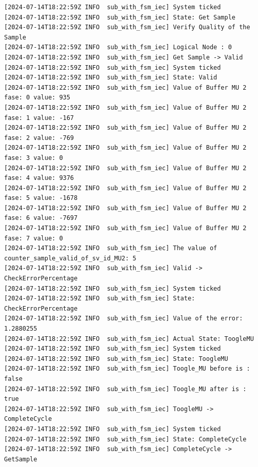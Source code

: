 \begin{lstlisting}[caption={Second scenario showing the steps through the state machine between the state Get Sample -> Valid, Valid -> Check the Error Percentage -> Toogle MU -> Complete Cycle -> Get Sample.}, label={lst:scenario2}]
[2024-07-14T18:22:59Z INFO  sub_with_fsm_iec] System ticked
[2024-07-14T18:22:59Z INFO  sub_with_fsm_iec] State: Get Sample
[2024-07-14T18:22:59Z INFO  sub_with_fsm_iec] Verify Quality of the Sample
[2024-07-14T18:22:59Z INFO  sub_with_fsm_iec] Logical Node : 0
[2024-07-14T18:22:59Z INFO  sub_with_fsm_iec] Get Sample -> Valid
[2024-07-14T18:22:59Z INFO  sub_with_fsm_iec] System ticked
[2024-07-14T18:22:59Z INFO  sub_with_fsm_iec] State: Valid
[2024-07-14T18:22:59Z INFO  sub_with_fsm_iec] Value of Buffer MU 2 fase: 0 value: 935
[2024-07-14T18:22:59Z INFO  sub_with_fsm_iec] Value of Buffer MU 2 fase: 1 value: -167
[2024-07-14T18:22:59Z INFO  sub_with_fsm_iec] Value of Buffer MU 2 fase: 2 value: -769
[2024-07-14T18:22:59Z INFO  sub_with_fsm_iec] Value of Buffer MU 2 fase: 3 value: 0
[2024-07-14T18:22:59Z INFO  sub_with_fsm_iec] Value of Buffer MU 2 fase: 4 value: 9376
[2024-07-14T18:22:59Z INFO  sub_with_fsm_iec] Value of Buffer MU 2 fase: 5 value: -1678
[2024-07-14T18:22:59Z INFO  sub_with_fsm_iec] Value of Buffer MU 2 fase: 6 value: -7697
[2024-07-14T18:22:59Z INFO  sub_with_fsm_iec] Value of Buffer MU 2 fase: 7 value: 0
[2024-07-14T18:22:59Z INFO  sub_with_fsm_iec] The value of counter_sample_valid_of_sv_id_MU2: 5
[2024-07-14T18:22:59Z INFO  sub_with_fsm_iec] Valid -> CheckErrorPercentage
[2024-07-14T18:22:59Z INFO  sub_with_fsm_iec] System ticked
[2024-07-14T18:22:59Z INFO  sub_with_fsm_iec] State: CheckErrorPercentage
[2024-07-14T18:22:59Z INFO  sub_with_fsm_iec] Value of the error: 1.2880255
[2024-07-14T18:22:59Z INFO  sub_with_fsm_iec] Actual State: ToogleMU
[2024-07-14T18:22:59Z INFO  sub_with_fsm_iec] System ticked
[2024-07-14T18:22:59Z INFO  sub_with_fsm_iec] State: ToogleMU
[2024-07-14T18:22:59Z INFO  sub_with_fsm_iec] Toogle_MU before is : false
[2024-07-14T18:22:59Z INFO  sub_with_fsm_iec] Toogle_MU after is : true
[2024-07-14T18:22:59Z INFO  sub_with_fsm_iec] ToogleMU -> CompleteCycle
[2024-07-14T18:22:59Z INFO  sub_with_fsm_iec] System ticked
[2024-07-14T18:22:59Z INFO  sub_with_fsm_iec] State: CompleteCycle
[2024-07-14T18:22:59Z INFO  sub_with_fsm_iec] CompleteCycle -> GetSample
\end{lstlisting}
